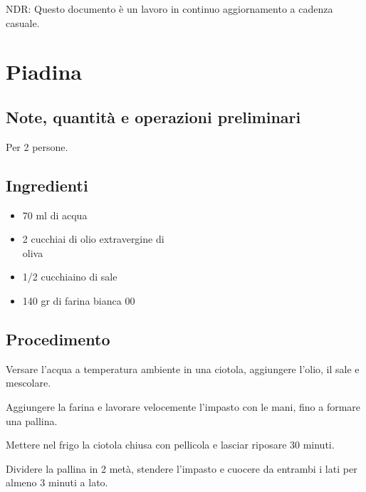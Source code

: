 \documentclass[12pt]{article}
\begin{document}
\medskip
NDR: Questo documento è un lavoro in continuo aggiornamento a cadenza casuale.


\renewcommand{\contentsname}{Scegli la tua abbuffata}	%
\tableofcontents			%
\newpage

\section{Piadina}

\subsection*{Note, quantità e operazioni preliminari}
Per 2 persone.

\bigskip
\bigskip

\begin{multicols}{2}
\subsection*{Ingredienti}
\begin{itemize}
	\item 70 ml di acqua
    \item 2 cucchiai di olio extravergine di \\ oliva
    \item 1/2 cucchiaino di sale
    \item 140 gr di farina bianca 00
\end{itemize}

\vspace*{\fill}


\columnbreak
\subsection*{Procedimento}

Versare l'acqua a temperatura ambiente in una ciotola, aggiungere l'olio, il sale e mescolare.
\medskip

Aggiungere la farina e lavorare velocemente l'impasto con le mani, fino a formare una pallina.
\medskip

Mettere nel frigo la ciotola chiusa con pellicola e lasciar riposare 30 minuti.
\medskip

Dividere la pallina in 2 metà, stendere l'impasto e cuocere da entrambi i lati per almeno 3 minuti a lato.

\end{multicols}
\end{document}
